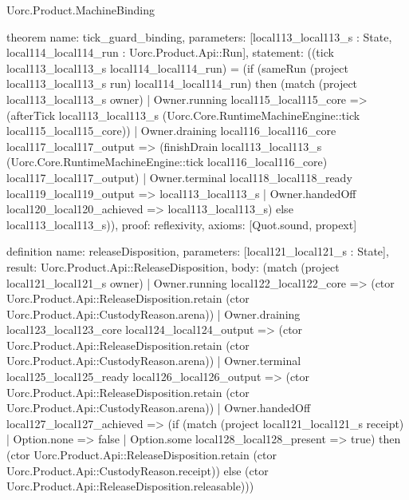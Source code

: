 \begin{lexlean}{Uorc.Product.MachineBinding}
\begin{semanticmodule}
theorem{
  name: tick_guard_binding,
  parameters: [local113_local113_s : State, local114_local114_run : Uorc.Product.Api::Run],
  statement: ((tick local113_local113_s local114_local114_run) = (if (sameRun (project local113_local113_s run) local114_local114_run) then (match (project local113_local113_s owner)
    | Owner.running local115_local115_core => (afterTick local113_local113_s (Uorc.Core.RuntimeMachineEngine::tick local115_local115_core))
    | Owner.draining local116_local116_core local117_local117_output => (finishDrain local113_local113_s (Uorc.Core.RuntimeMachineEngine::tick local116_local116_core) local117_local117_output)
    | Owner.terminal local118_local118_ready local119_local119_output => local113_local113_s
    | Owner.handedOff local120_local120_achieved => local113_local113_s) else local113_local113_s)),
  proof: reflexivity{},
  axioms: [Quot.sound, propext]
}

definition{
  name: releaseDisposition,
  parameters: [local121_local121_s : State],
  result: Uorc.Product.Api::ReleaseDisposition,
  body: (match (project local121_local121_s owner)
    | Owner.running local122_local122_core => (ctor Uorc.Product.Api::ReleaseDisposition.retain (ctor Uorc.Product.Api::CustodyReason.arena))
    | Owner.draining local123_local123_core local124_local124_output => (ctor Uorc.Product.Api::ReleaseDisposition.retain (ctor Uorc.Product.Api::CustodyReason.arena))
    | Owner.terminal local125_local125_ready local126_local126_output => (ctor Uorc.Product.Api::ReleaseDisposition.retain (ctor Uorc.Product.Api::CustodyReason.arena))
    | Owner.handedOff local127_local127_achieved => (if (match (project local121_local121_s receipt)
      | Option.none => false
      | Option.some local128_local128_present => true) then (ctor Uorc.Product.Api::ReleaseDisposition.retain (ctor Uorc.Product.Api::CustodyReason.receipt)) else (ctor Uorc.Product.Api::ReleaseDisposition.releasable)))
}


\end{semanticmodule}
\end{lexlean}
